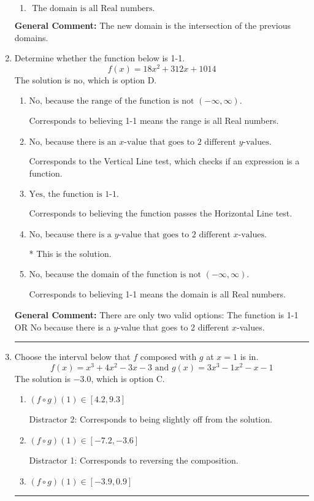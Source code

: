 \documentclass{extbook}[14pt]
\newcommand{\litem}[1]{\item #1

\rule{\textwidth}{0.4pt}}
\begin{document}
\begin{enumerate}
{\begin{enumerate}[label=\Alph*.]
\item \( \text{ The domain is all Real numbers. } \)


\end{enumerate}

\textbf{General Comment:} The new domain is the intersection of the previous domains.
}
\litem{
Determine whether the function below is 1-1.
\[ f(x) = 18 x^2 + 312 x + 1014 \]The solution is \( \text{no} \), which is option D.\begin{enumerate}[label=\Alph*.]
\item \( \text{No, because the range of the function is not $(-\infty, \infty)$.} \)

Corresponds to believing 1-1 means the range is all Real numbers.
\item \( \text{No, because there is an $x$-value that goes to 2 different $y$-values.} \)

Corresponds to the Vertical Line test, which checks if an expression is a function.
\item \( \text{Yes, the function is 1-1.} \)

Corresponds to believing the function passes the Horizontal Line test.
\item \( \text{No, because there is a $y$-value that goes to 2 different $x$-values.} \)

* This is the solution.
\item \( \text{No, because the domain of the function is not $(-\infty, \infty)$.} \)

Corresponds to believing 1-1 means the domain is all Real numbers.
\end{enumerate}

\textbf{General Comment:} There are only two valid options: The function is 1-1 OR No because there is a $y$-value that goes to 2 different $x$-values.
}
\litem{
Choose the interval below that $f$ composed with $g$ at $x=1$ is in.
\[ f(x) = x^{3} +4 x^{2} -3 x -3 \text{ and } g(x) = 3x^{3} -1 x^{2} -x -1 \]The solution is \( -3.0 \), which is option C.\begin{enumerate}[label=\Alph*.]
\item \( (f \circ g)(1) \in [4.2, 9.3] \)

 Distractor 2: Corresponds to being slightly off from the solution.
\item \( (f \circ g)(1) \in [-7.2, -3.6] \)

 Distractor 1: Corresponds to reversing the composition.
\item \( (f \circ g)(1) \in [-3.9, 0.9] \)


\end{enumerate}}
\end{enumerate}
\end{document}
